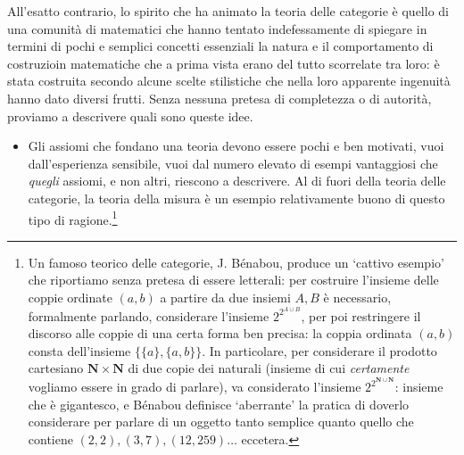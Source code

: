 All'esatto contrario, lo spirito che ha animato la teoria delle categorie è quello di una comunità di matematici che hanno tentato indefessamente di spiegare in termini di pochi e semplici concetti essenziali la natura e il comportamento di costruzioin matematiche che a prima vista erano del tutto scorrelate tra loro: è stata costruita secondo alcune scelte stilistiche che nella loro apparente ingenuità hanno dato diversi frutti. Senza nessuna pretesa di completezza o di autorità, proviamo a descrivere quali sono queste idee.
\begin{itemize}
	\item Gli assiomi che fondano una teoria devono essere pochi e ben motivati, vuoi dall'esperienza sensibile, vuoi dal numero elevato di esempi vantaggiosi che \emph{quegli} assiomi, e non altri, riescono a descrivere. Al di fuori della teoria delle categorie, la teoria della misura è un esempio relativamente buono di questo tipo di ragione.\footnote{Un famoso teorico delle categorie, J. Bénabou, produce un `cattivo esempio' che riportiamo senza pretesa di essere letterali: per costruire l'insieme delle coppie ordinate \((a,b)\) a partire da due insiemi \(A,B\) è necessario, formalmente parlando, considerare l'insieme \(2^{2^{A\cup B}}\), per poi restringere il discorso alle coppie di una certa forma ben precisa: la coppia ordinata $(a,b)$ consta dell'insieme $\{\{a\},\{a,b\}\}$. In particolare, per considerare il prodotto cartesiano \(\mathbf{N} \times \mathbf{N}\) di due copie dei naturali (insieme di cui \emph{certamente} vogliamo essere in grado di parlare), va considerato l'insieme \(2^{2^{\mathbf{N} \cup \mathbf{N}}}\): insieme che è gigantesco, e Bénabou definisce `aberrante' la pratica di doverlo considerare per parlare di un oggetto tanto semplice quanto quello che contiene \((2,2), (3,7), (12, 259)\dots\) eccetera.

}
\end{itemize}
